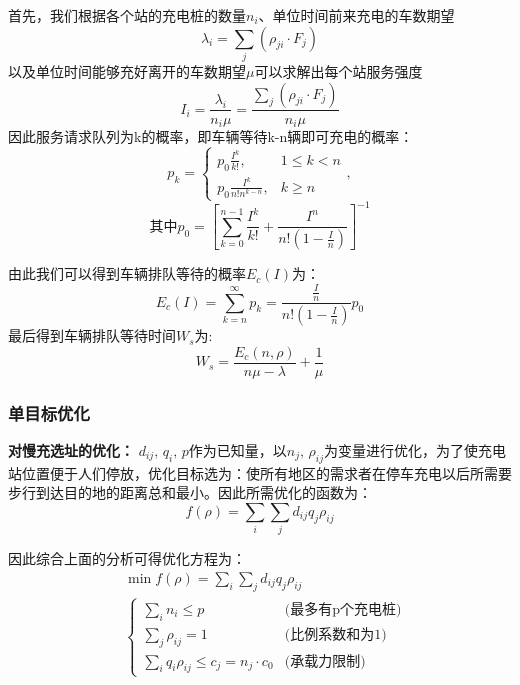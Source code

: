 \documentclass[12pt, a4paper, oneside]{ctexart}
\begin{document}
\begin{enumerate}[label = \roman*)]
        首先，我们根据各个站的充电桩的数量\(n_i\)、单位时间前来充电的车数期望
        \begin{dmath}
            \lambda_i=\sum\limits_j(\rho_{ji}\cdot F_j)
        \end{dmath}
        以及单位时间能够充好离开的车数期望\(\mu\)可以求解出每个站服务强度
        \begin{dmath}
            I_i=\frac{\lambda_i}{n_i\mu}=\frac{\sum\limits_j(\rho_{ji}\cdot F_j)}{n_i\mu}
        \end{dmath}
        因此服务请求队列为k的概率，即车辆等待k-n辆即可充电的概率：
        \begin{dmath}
            p_{k}=\begin{cases}
                p_{0} \frac{I^{k}}{k !}, &1 \leqslant k<n \\
                p_{0} \frac{I^{k}}{n ! n^{k-n}}, &k \geqslant n
            \end{cases},
        \end{dmath}
        \begin{dmath}
            \text{其中}p_{0}=\left[\sum_{k=0}^{n-1} \frac{I^{k}}{k !}+\frac{I^{n}}{n !\left(1-\frac{I}{n}\right)}\right]^{-1}
        \end{dmath}

        由此我们可以得到车辆排队等待的概率\(E_c(I)\)为：
        \begin{dmath}
            E_{c}(I)=\sum_{k=n}^{\infty} p_{k}=\frac{\frac{I}{n}}{n !\left(1-\frac{I}{n}\right)} p_{0}
        \end{dmath}
        最后得到车辆排队等待时间\(W_s\)为:
        \begin{dmath}
            W_s=\frac{E_{c}(n, \rho)}{n \mu-\lambda}+\frac{1}{\mu}
        \end{dmath}
\end{enumerate}


\subsubsection{单目标优化}
\textbf{对慢充选址的优化：}
\(d_{ij},\,q_i,\,p\)作为已知量，以\(n_j,\,\rho_{ij}\)为变量进行优化，为了使充电站位置便于人们停放，优化目标选为：使所有地区的需求者在停车充电以后所需要步行到达目的地的距离总和最小。因此所需优化的函数为：
\begin{dmath}
    f(\rho)=\sum_i \sum_jd_{ij} q_j \rho_{ij}
\end{dmath}

因此综合上面的分析可得优化方程为：
\begin{align*}
     & \min  f(\rho)=\sum_i \sum_jd_{ij} q_j \rho_{ij} \\
     & \begin{cases}
        \sum\limits_i n_i\leqslant p                                     & \text{(最多有p个充电桩)} \\
        \sum\limits_j \rho_{ij}=1                               & \text{(比例系数和为1)} \\
        \sum\limits_i q_{i}\rho_{ij}\leqslant c_j=n_j \cdot c_0 & \text{(承载力限制)}
    \end{cases}
\end{align*}
\end{document}
